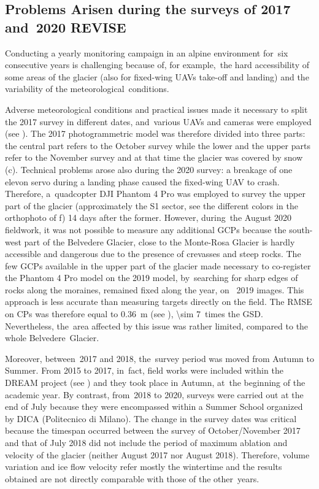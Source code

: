 \subsection{Problems Arisen during the surveys of 2017 and~2020 {\color{red} REVISE}} \label{sec:3:problems} 
Conducting a yearly monitoring campaign in an alpine environment for~six consecutive
years is challenging because of, for example,~the hard accessibility of some areas of the
glacier (also for fixed-wing UAVs take-off and landing) and the variability of the
meteorological~conditions.

Adverse meteorological conditions and practical issues made it necessary to split the
2017 survey in different dates, and~various UAVs and cameras were employed (see
).
The 2017 photogrammetric model was therefore divided into three parts: the central part
refers to the October survey while the lower and the upper parts refer to the November
survey and at that time the glacier was covered by snow (c).
Technical problems arose also during the 2020 survey: a breakage of one elevon servo
during a landing phase caused the fixed-wing UAV to crash.
Therefore, a~quadcopter DJI Phantom 4 Pro was employed to survey the upper part of the
glacier (approximately the S1 sector, see the different colors in the orthophoto of
f) 14 days after the former.
However, during~the August 2020 fieldwork, it was not possible to measure any additional
GCPs because the south-west part of the Belvedere Glacier, close to the Monte-Rosa
Glacier is hardly accessible and dangerous due to the presence of crevasses and steep
rocks.
The few GCPs available in the upper part of the glacier made necessary to co-register the
Phantom 4 Pro model on the 2019 model, by~searching for sharp edges of rocks along the
moraines, remained fixed along the year, on~ 2019 images.
This approach is less accurate than measuring targets directly on the field.
The RMSE on CPs was therefore equal to \SI{0.36}{\meter} (see
), \SI{\sim 7}{}~times the GSD.
Nevertheless, the~area affected by this issue was rather limited, compared to the whole
Belvedere~Glacier.

Moreover, between~2017 and 2018, the~survey period was moved from Autumn to Summer.
From 2015 to 2017, in~fact, field works were included within the DREAM project (see
) and they took place in Autumn, at~the beginning of the academic
year.
By contrast, from~2018 to 2020, surveys were carried out at the end of July because they
were encompassed within a Summer School organized by DICA (Politecnico di Milano).
The change in the survey dates was critical because the timespan occurred between the
survey of October/November 2017 and that of July 2018 did not include the period of
maximum ablation and velocity of the glacier (neither August 2017 nor August 2018).
Therefore, volume variation and ice flow velocity refer mostly the wintertime and the
results obtained are not directly comparable with those of the other~years.


